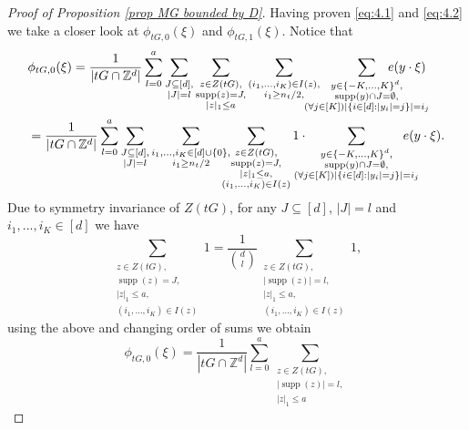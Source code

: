 \documentclass[a4paper,oneside, reqno]{amsart}
\numberwithin{equation}{section}
\theoremstyle{definition}%
\theoremstyle{definition}
\theoremstyle{definition}%
\theoremstyle{definition}
\newcommand{\Z}{\mathbb{Z}}
\DeclareMathOperator{\supp}{supp}
\begin{document}
\begin{proof}[Proof of Proposition \ref{prop MG bounded by D}]
Having proven \eqref{eq:4.1} and \eqref{eq:4.2} we take a closer look at $\phi_{tG,0}(\xi)$ and $\phi_{tG,1}(\xi).$ Notice that 
\begin{align*}
&\phi_{tG,0}(\xi)= \frac{1}{|tG \cap \Z^d|} \sum_{l=0}^a \sum_{\substack{J \subseteq [d], \\ |J|=l}}\sum_{\substack{z \in Z(tG),
\\ \supp(z)=J, \\ |z|_1 \le a
}}  \sum_{\substack{(i_1,...,i_K) \in I(z), 
\\ 
i_1 \geq n_t/2, 
}} 
\hspace{-0.5cm} \sum_{\substack{y \in \{-K,...,K\}^d,  
\\ \supp(y) \cap J= \emptyset, 
\\
(\forall j \in [K]) |\{i \in [d]: |y_i|=j\}|=i_j
}} \hspace{-1.2cm} e(y \cdot \xi) 
\\
&=\frac{1}{|tG \cap \Z^d|} \sum_{l=0}^a \sum_{\substack{J \subseteq [d], \\ |J|=l}} \sum_{\substack{i_1,...,i_K \in [d] \cup\{0\}, 
\\
i_1 \geq n_t/2
}} \hspace{-0.3cm} \sum_{\substack{z \in Z(tG),
\\ \supp(z)=J, \\ |z|_1 \le a, \\ (i_1,\ldots, i_K) \in I(z)
}} 1 \cdot
\hspace{-0.4cm}
\sum_{\substack{y \in \{-K,...,K\}^d, 
\\ \supp(y) \cap J= \emptyset, 
\\
(\forall j \in [K]) |\{i \in [d]: |y_i|=j\}|=i_j
}} \hspace{-0.5cm}e(y \cdot \xi).
\end{align*}
Due to symmetry invariance of $Z(tG)$, for any $J \subseteq [d]$, $|J|=l$ and $i_1,...,i_K \in [d]$ we have
\[
\sum_{\substack{z \in Z(tG),
\\ \supp(z)=J, \\ |z|_1 \le a, \\ (i_1,\ldots, i_K) \in I(z)
}} 1= \frac{1}{\binom{d}{l}}\sum_{\substack{z \in Z(tG),
\\ |\supp(z)|=l, \\ |z|_1 \le a, \\ (i_1,\ldots, i_K) \in I(z)
}} 1,
\]
using the above and changing order of sums we obtain
\[
\phi_{tG,0}(\xi)
=\frac{1}{|tG \cap \Z^d|} \sum_{l=0}^a \sum_{\substack{z \in Z(tG),
\\ |\supp(z)|=l, \\ |z|_1 \le a
}}\]
\end{proof}
\end{document}
